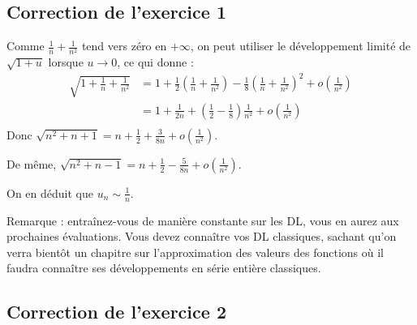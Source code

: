 \documentclass[11pt,a4paper]{article}
\begin{document}
\subsection*{Correction de l'exercice 1}
Comme $\frac1n+\frac{1}{n^2}$ tend vers zéro en $+\infty$, on peut utiliser le développement limité de $\sqrt{1+u}$ lorsque $u\to 0$, ce qui donne : 
\begin{align*}
\sqrt{1+\frac{1}{n}+\frac{1}{n^2}}
&= 1+\frac12\left(\frac{1}{n}+\frac{1}{n^2}\right)-\frac18\left(\frac{1}{n}+\frac{1}{n^2}\right)^2+o\left(\frac{1}{n^2}\right)\\
&= 1+ \frac{1}{2n} +\left(\frac{1}{2} - \frac{1}{8}\right)\frac{1}{n^2}+o\left(\frac{1}{n^2}\right)\\
\end{align*}
Donc $\sqrt{n^2+n+1} = n+\frac{1}{2} + \frac{3}{8n} + o\left(\frac{1}{n^2}\right)$.

De même, $\sqrt{n^2+n-1} = n+\frac{1}{2} - \frac{5}{8n} + o\left(\frac{1}{n^2}\right)$.

On en déduit que $u_n \sim \frac{1}{n}$.

Remarque : entraînez-vous de manière constante sur les DL, vous en aurez aux prochaines évaluations. Vous devez connaître vos DL classiques, sachant qu'on verra bientôt un chapitre sur l'approximation des valeurs des fonctions où il faudra connaître ses développements en série entière classiques.


\subsection*{Correction de l'exercice 2}
\end{document}
